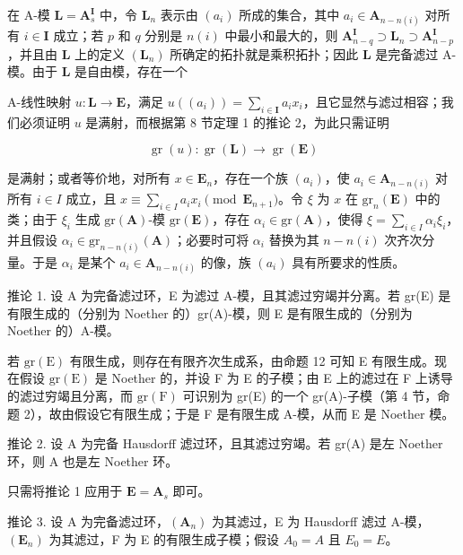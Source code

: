	在 A-模 \(\mathbf{L} = \mathbf{A}_s^{\mathbf{I}}\) 中，令 \(\mathbf{L}_n\) 表示由 \((a_i)\) 所成的集合，其中 \(a_i \in \mathbf{A}_{n - n(i)}\) 对所有 \(i \in \mathbf{I}\) 成立；若 \(p\) 和 \(q\) 分别是 \(n(i)\) 中最小和最大的，则 \(\mathbf{A}_{n - q}^{\mathbf{I}} \supset \mathbf{L}_n \supset \mathbf{A}_{n - p}^{\mathbf{I}}\)，并且由 \(\mathbf{L}\) 上的定义 \((\mathbf{L}_n)\) 所确定的拓扑就是乘积拓扑；因此 \(\mathbf{L}\) 是完备滤过 A-模。由于 \(\mathbf{L}\) 是自由模，存在一个

A-线性映射 \(u: \mathbf{L} \to \mathbf{E}\)，满足 \(u((a_i)) = \sum_{i \in \mathbf{I}} a_i x_i\)，且它显然与滤过相容；我们必须证明 \(u\) 是满射，而根据第 8 节定理 1 的推论 2，为此只需证明

\[
\operatorname{gr} (u): \operatorname{gr} (\mathbf {L}) \rightarrow \operatorname{gr} (\mathbf {E})
\]

	是满射；或者等价地，对所有 \(x \in \mathbf{E}_n\)，存在一个族 \((a_i)\)，使 \(a_i \in \mathbf{A}_{n-n(i)}\) 对所有 \(i \in I\) 成立，且 \(x \equiv \sum_{i \in I} a_i x_i \pmod{\mathbf{E}_{n+1}}\)。令 \(\xi\) 为 \(x\) 在 \(\mathrm{gr}_n(\mathbf{E})\) 中的类；由于 \(\xi_i\) 生成 \(\mathrm{gr}(\mathbf{A})\)-模 \(\mathrm{gr}(\mathbf{E})\)，存在 \(\alpha_i \in \mathrm{gr}(\mathbf{A})\)，使得 \(\xi = \sum_{i \in I} \alpha_i \xi_i\)，并且假设 \(\alpha_i \in \mathrm{gr}_{n-n(i)}(\mathbf{A})\)；必要时可将 \(\alpha_i\) 替换为其 \(n - n(i)\) 次齐次分量。于是 \(\alpha_i\) 是某个 \(a_i \in \mathbf{A}_{n-n(i)}\) 的像，族 \((a_i)\) 具有所要求的性质。

推论 1. 设 A 为完备滤过环，E 为滤过 A-模，且其滤过穷竭并分离。若 gr(E) 是有限生成的（分别为 Noether 的）gr(A)-模，则 E 是有限生成的（分别为 Noether 的）A-模。

若 \(\mathrm{gr}(\mathrm{E})\) 有限生成，则存在有限齐次生成系，由命题 12 可知 E 有限生成。现在假设 \(\mathrm{gr}(\mathrm{E})\) 是 Noether 的，并设 F 为 E 的子模；由 E 上的滤过在 F 上诱导的滤过穷竭且分离，而 \(\mathrm{gr}(\mathrm{F})\) 可识别为 gr(E) 的一个 gr(A)-子模（第 4 节，命题 2），故由假设它有限生成；于是 F 是有限生成 A-模，从而 E 是 Noether 模。

推论 2. 设 A 为完备 Hausdorff 滤过环，且其滤过穷竭。若 gr(A) 是左 Noether 环，则 A 也是左 Noether 环。

只需将推论 1 应用于 \(\mathbf{E} = \mathbf{A}_s\) 即可。

推论 3. 设 A 为完备滤过环，\((\mathbf{A}_{n})\) 为其滤过，E 为 Hausdorff 滤过 A-模，\((\mathbf{E}_{n})\) 为其滤过，F 为 E 的有限生成子模；假设 \(A_{0} = A\) 且 \(E_{0} = E\)。

